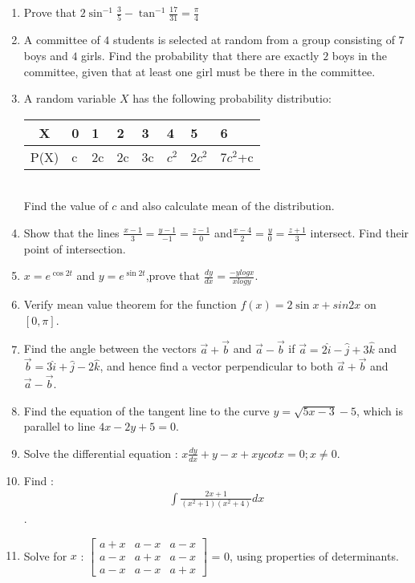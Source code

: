 \documentclass[12pt,-letter paper]{article}
\providecommand{\myvec}[1]{\ensuremath{\begin{bmatrix}#1\end{bmatrix}}}
\providecommand{\brak}[1]{\ensuremath{\left(#1\right)}}
\begin{document}
\begin{enumerate}
\item  Prove that $2\sin^{-1}\frac{3}{5}-\tan^{-1}\frac{17}{31}=\frac{\pi}{4}$
\item A committee of $4$ students is selected at random from a group consisting of $7$ boys and $4$ girls. Find the probability that there are exactly $2$ boys in the committee, given that at least one girl must be there in the committee.
\item A random variable $X$ has the following probability distributio: 
\begin{table}[htb]
 \centering
  \begin{tabularx}{\textwidth}{|c|X|X|X|X|X|X|X|}
 \hline
 X & 0 & 1 & 2 & 3 & 4 & 5 & 6 \\
  \hline
 P(X) & c & 2c & 2c & 3c & $c^2$ & $2c^2$ & $7c^2$+c \\
  \hline
  \end{tabularx}
\end{table}\\
	Find the value of $c$ and also calculate mean of the distribution.
 \item Show that the lines $\frac{x-1}{3}=\frac{y-1}{-1}=\frac{z-1}{0}$ and$\frac{x-4}{2}=\frac{y}{0}=\frac{z+1}{3}$  intersect. Find their point of intersection.
 \item $x=e^{\cos{2t}}$ and $y=e^{\sin{2t}}$,prove that $\frac{dy}{dx}=\frac{-ylogx}{xlogy}$.
 \item Verify mean value theorem for the function $f\brak{x}=2\sin{x}+sin{2x}$ on $[0,\pi]$.
\item Find the angle  between the vectors $\overset{\rightarrow}{a}+\overset{\rightarrow}{b}$ and $\overset{\rightarrow}{a}-\overset{\rightarrow}{b}$ if $\overset{\rightarrow}{a}=2\hat{i}-\hat{j}+3\hat{k}$ and $\overset{\rightarrow}{b}=3\hat{i}+\hat{j}-2\hat{k}$, and hence find a vector perpendicular to both $\overset{\rightarrow}{a}+\overset{\rightarrow}{b}$ and $\overset{\rightarrow}{a}-\overset{\rightarrow}{b}$.
\item Find the equation of the tangent line to the curve $y=\sqrt{5x-3}-5$, which is parallel to line $4x-2y+5=0$.
\item Solve the differential equation :  $x\frac{dy}{dx}+y-x+xycotx=0 ; x\neq0$.
\item Find :\begin{align*}
		\int\frac{2x+1}{\brak{x^2+1}\brak{x^2+4}}dx
	\end{align*}.
\item Solve for $x$ : $\myvec{a+x & a-x & a-x \\ a-x & a+x & a-x \\ a-x & a-x & a+x }$ = 0, using properties of determinants.

\end{enumerate}
\end{document}
